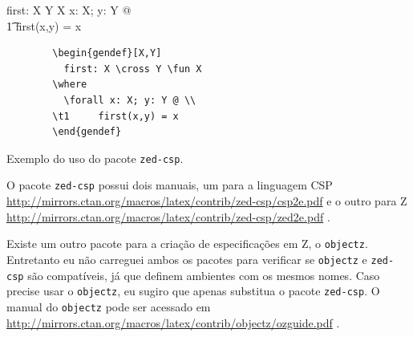 \begin{gendef}[X,Y]
	first: X \cross Y \fun X
\where
		\forall x: X; y: Y @ \\
\t1     first(x,y) = x
\end{gendef}

\begin{listing}[ht]
	\begin{verbatim}
		\begin{gendef}[X,Y]
		  first: X \cross Y \fun X
		\where
		  \forall x: X; y: Y @ \\
		\t1     first(x,y) = x
		\end{gendef}
	\end{verbatim} 
	\caption{Exemplo do uso do pacote \texttt{zed-csp}.}
	\label{cod:zed-csp}
\end{listing}

O pacote \texttt{zed-csp} possui dois manuais, um para a linguagem CSP \url{http://mirrors.ctan.org/macros/latex/contrib/zed-csp/csp2e.pdf} \parencite{csp} e o outro para Z \url{http://mirrors.ctan.org/macros/latex/contrib/zed-csp/zed2e.pdf} \parencite{zed}. 

Existe um outro pacote para a criação de especificações em Z, o \texttt{objectz}. Entretanto eu não carreguei ambos os pacotes para verificar se \texttt{objectz} e \texttt{zed-csp} são compatíveis, já que definem ambientes com os mesmos nomes. Caso precise usar o \texttt{objectz}, eu sugiro que apenas substitua o pacote \texttt{zed-csp}. O manual do \texttt{objectz} pode ser acessado em \url{http://mirrors.ctan.org/macros/latex/contrib/objectz/ozguide.pdf} \parencite{objectz}.





